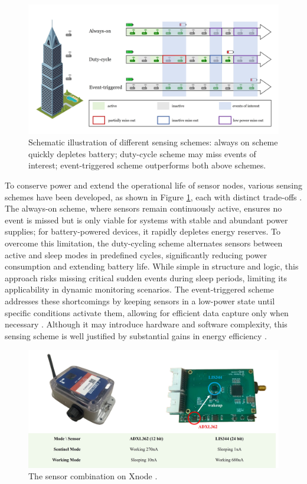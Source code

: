 \documentclass[a4paper,fleqn,numbers,sort&compress]{cas-sc}
\begin{document}
\begin{figure}[htbp]
    \centering
    \includegraphics[width=0.85\linewidth]{Fig1.jpg}
    \caption{Schematic illustration of different sensing schemes: always on scheme quickly depletes battery; duty-cycle scheme may miss events of interest; event-triggered scheme outperforms both above schemes.}
    \label{fig:Sensing Schemes}
\end{figure}

To conserve power and extend the operational life of sensor nodes, various sensing schemes have been developed, as shown in Figure \ref{fig:Sensing Schemes}, each with distinct trade-offs \citep{fu_suddenevent_2019, ni_sensor_2023, fanariotis_reducingpowerconsumption_2024}. The always-on scheme, where sensors remain continuously active, ensures no event is missed but is only viable for systems with stable and abundant power supplies; for battery-powered devices, it rapidly depletes energy reserves. To overcome this limitation, the duty-cycling scheme alternates sensors between active and sleep modes in predefined cycles, significantly reducing power consumption and extending battery life. While simple in structure and logic, this approach risks missing critical sudden events during sleep periods, limiting its applicability in dynamic monitoring scenarios. The event-triggered scheme addresses these shortcomings by keeping sensors in a low-power state until specific conditions activate them, allowing for efficient data capture only when necessary \citep{sarwar_multimetric_2020, fu_distributed_2024}. Although it may introduce hardware and software complexity, this sensing scheme is well justified by substantial gains in energy efficiency \citep{fu_suddenevent_2019, fu_effectivestructuralimpact_2025}.

\begin{figure}[htbp]
    \centering
    \includegraphics[width=0.85\linewidth]{Fig2.jpg}
    \caption{The sensor combination on Xnode \citep{fu_suddenevent_2019}.}
    \label{fig:Xnode Sensor Combination}
\end{figure}
\end{document}
